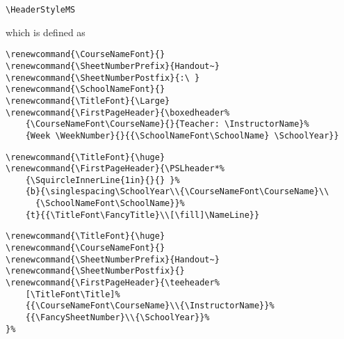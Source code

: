 \documentclass[12pt,twoside,parskip,notitle]{handout}
\begin{document}
\newpage

\begingroup
\HeaderStyleMS
\maketitle
\verb|\HeaderStyleMS|

which is defined as

\singlespacing
\begin{verbatim}
\renewcommand{\CourseNameFont}{}
\renewcommand{\SheetNumberPrefix}{Handout~}
\renewcommand{\SheetNumberPostfix}{:\ }
\renewcommand{\SchoolNameFont}{}
\renewcommand{\TitleFont}{\Large}
\renewcommand{\FirstPageHeader}{\boxedheader%
    {\CourseNameFont\CourseName}{}{Teacher: \InstructorName}%
    {Week \WeekNumber}{}{{\SchoolNameFont\SchoolName} \SchoolYear}}
\end{verbatim}
\endgroup

\newpage

\begingroup
\renewcommand{\Title}{A very very very long title indeed!}
\renewcommand{\TitleFont}{\huge}
\renewcommand{\FirstPageHeader}{\PSLheader*%
	{\SquircleInnerLine{1in}{}{}}%
	{b}{\singlespacing\SchoolYear\\{\CourseNameFont\CourseName}\\{\SchoolNameFont\SchoolName}}%
	{t}{{\TitleFont\FancyTitle}\\[\fill]\NameLine}}
\maketitle
\singlespacing
\begin{verbatim}
\renewcommand{\TitleFont}{\huge}
\renewcommand{\FirstPageHeader}{\PSLheader*%
    {\SquircleInnerLine{1in}{}{} }%
    {b}{\singlespacing\SchoolYear\\{\CourseNameFont\CourseName}\\
      {\SchoolNameFont\SchoolName}}%
    {t}{{\TitleFont\FancyTitle}\\[\fill]\NameLine}}
\end{verbatim}
\endgroup

\newpage

\begingroup
\renewcommand{\TitleFont}{\huge}
\renewcommand{\CourseNameFont}{}
\renewcommand{\SheetNumberPrefix}{Handout~}
\renewcommand{\SheetNumberPostfix}{}
\renewcommand{\FirstPageHeader}{\teeheader%
	[\TitleFont\Title]%
	{{\CourseNameFont\CourseName}\\{\InstructorName}}%
	{{\FancySheetNumber}\\{\SchoolYear}}%
}%
\maketitle
\singlespacing
\begin{verbatim}
\renewcommand{\TitleFont}{\huge}
\renewcommand{\CourseNameFont}{}
\renewcommand{\SheetNumberPrefix}{Handout~}
\renewcommand{\SheetNumberPostfix}{}
\renewcommand{\FirstPageHeader}{\teeheader%
    [\TitleFont\Title]%
    {{\CourseNameFont\CourseName}\\{\InstructorName}}%
    {{\FancySheetNumber}\\{\SchoolYear}}%
}%
\end{verbatim}
\endgroup
\end{document}
